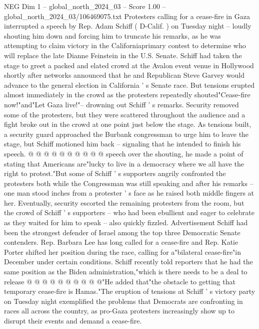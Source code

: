 \begin{textsample}{NEG Dim 1 – global\_north\_2024\_03 – Score 1.00 – global\_north\_2024\_03/106469075.txt}  \label{ex:f1_neg_397}
Protesters calling for a cease-fire in Gaza interrupted a speech by Rep.
Adam Schiff ( D-Calif. ) on Tuesday night -- loudly shouting him down and forcing him to truncate his remarks, as he was attempting to claim victory in the Californiaprimary contest to determine who will replace the late Dianne Feinstein in the U.S.
Senate.
Schiff had taken the stage to greet a packed and elated crowd at the Avalon event venue in Hollywood shortly after networks announced that he and Republican Steve Garvey would advance to the general election in California ' s Senate race.
But tensions erupted almost immediately in the crowd as the protesters repeatedly shouted"Cease-fire now!"and"Let Gaza live!"-- drowning out Schiff ' s remarks.
Security removed some of the protesters, but they were scattered throughout the audience and a fight broke out in the crowd at one point just below the stage.
As tensions built, a security guard approached the Burbank congressman to urge him to leave the stage, but Schiff motioned him back -- signaling that he intended to finish his speech. @ @ @ @ @ @ @ @ @ @ speech over the shouting, he made a point of stating that Americans are"lucky to live in a democracy where we all have the right to protest."But some of Schiff ' s supporters angrily confronted the protesters both while the Congressman was still speaking and after his remarks -- one man stood inches from a protester ' s face as he raised both middle fingers at her.
Eventually, security escorted the remaining protesters from the room, but the crowd of Schiff ' s supporters -- who had been ebullient and eager to celebrate as they waited for him to speak -- also quickly fizzled.
Advertisement Schiff had been the strongest defender of Israel among the top three Democratic Senate contenders.
Rep.
Barbara Lee has long called for a cease-fire and Rep.
Katie Porter shifted her position during the race, calling for a"bilateral cease-fire"in December under certain conditions.
Schiff recently told reporters that he had the same position as the Biden administration,"which is there needs to be a deal to release @ @ @ @ @ @ @ @ @ @"He added that"the obstacle to getting that temporary cease-fire is Hamas."The eruption of tensions at Schiff ' s victory party on Tuesday night exemplified the problems that Democrats are confronting in races all across the country, as pro-Gaza protesters increasingly show up to disrupt their events and demand a cease-fire.

\end{textsample}
